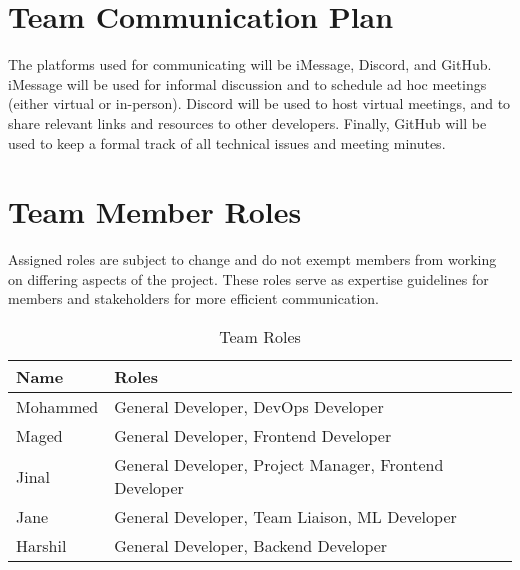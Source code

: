 \documentclass{article}
\begin{document}
\section{Team Communication Plan}
The platforms used for communicating will be iMessage, Discord, and GitHub. iMessage will be
used for informal discussion and to schedule ad hoc meetings (either virtual or in-person).
Discord will be used to host virtual meetings, and to share relevant links and resources to other
developers. Finally, GitHub will be used to keep a formal track of all technical issues and
meeting minutes.

\section{Team Member Roles}
Assigned roles are subject to change and do not exempt members from working on differing
aspects of the project. These roles serve as expertise guidelines for members and stakeholders
for more efficient communication.

\begin{table}[H]
\caption{Team Roles}
\label{tab:team-roles}
\begin{tabular}{|l|l|}
\hline
\textbf{Name} & \textbf{Roles} \\ \hline
Mohammed & General Developer, DevOps Developer \\ \hline
Maged & General Developer, Frontend Developer \\ \hline
Jinal & General Developer, Project Manager, Frontend Developer \\ \hline
Jane & General Developer, Team Liaison, ML Developer \\ \hline
Harshil & General Developer, Backend Developer \\ \hline
\end{tabular}
\end{table}
\end{document}
